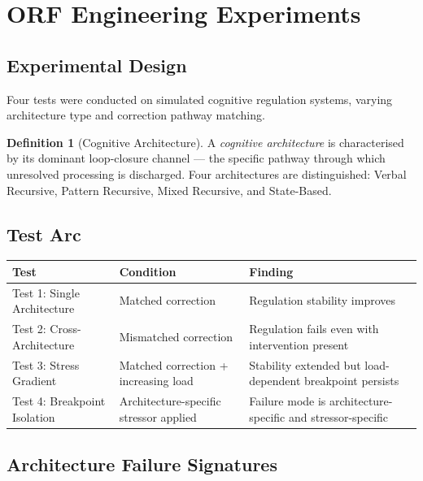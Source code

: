 \documentclass[12pt,a4paper]{article}
\theoremstyle{definition}
\newtheorem{definition}{Definition}[section]
\begin{document}
\section{ORF Engineering Experiments}

\subsection{Experimental Design}

Four tests were conducted on simulated cognitive regulation systems,
varying architecture type and correction pathway matching.

\begin{definition}[Cognitive Architecture]
  A \emph{cognitive architecture} is characterised by its dominant
  loop-closure channel — the specific pathway through which unresolved
  processing is discharged.  Four architectures are distinguished:
  Verbal Recursive, Pattern Recursive, Mixed Recursive, and State-Based.
\end{definition}

\subsection{Test Arc}

\begin{longtable}{@{}p{3.5cm}p{5.5cm}p{4.5cm}@{}}
  \toprule
  \textbf{Test} & \textbf{Condition} & \textbf{Finding} \\
  \midrule
  Test 1: Single Architecture & Matched correction & Regulation stability
    improves \\
  Test 2: Cross-Architecture & Mismatched correction & Regulation fails even
    with intervention present \\
  Test 3: Stress Gradient & Matched correction + increasing load &
    Stability extended but load-dependent breakpoint persists \\
  Test 4: Breakpoint Isolation & Architecture-specific stressor applied &
    Failure mode is architecture-specific and stressor-specific \\
  \bottomrule
\end{longtable}

\subsection{Architecture Failure Signatures}
\end{document}
